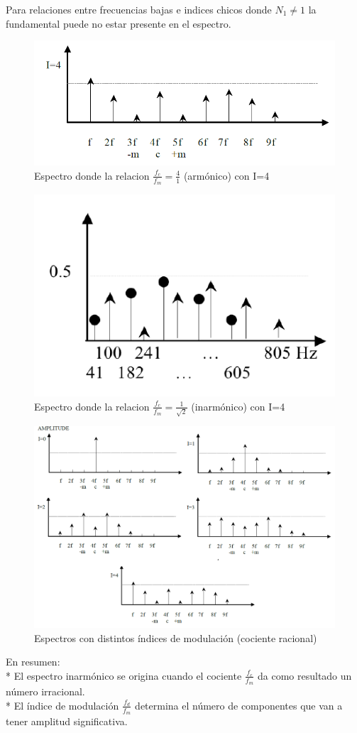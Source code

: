 \documentclass[assd_tp2_main.tex]{subfiles}
\begin{document}
Para relaciones entre frecuencias bajas e indices chicos donde $N_1\neq1$ la fundamental puede no estar presente en el espectro.

\begin{figure}[H]
\centering
\includegraphics[width=0.5\linewidth]{graficos/EJ4/espectroharmonico.png}
\caption{Espectro donde la relacion $\displaystyle \frac{f_c}{f_m}=\frac{4}{1}$ (armónico) con I=4 }
\label{fig:harmonico}
\end{figure}

\begin{figure}[H]
\centering
\includegraphics[width=0.3\linewidth]{graficos/EJ4/espectroinharmonico.png}
\caption{Espectro donde la relacion $\displaystyle \frac{f_c}{f_m}=\frac{1}{\sqrt{2}}$ (inarmónico) con I=4}
\label{fig:inharmonico}
\end{figure}

\begin{figure}[H]
\centering
\includegraphics[width=0.8\linewidth]{graficos/EJ4/chowning.png}
\caption{Espectros con distintos índices de modulación (cociente racional)}
\label{fig:chowning}
\end{figure}


En resumen:\\*
El espectro inarmónico se origina cuando el cociente $\displaystyle \frac{f_c}{f_m}$ da como resultado un número irracional. \\*
El índice de modulación $\displaystyle \frac{f_d}{f_m}$ determina el número de componentes que van a tener amplitud significativa.
\end{document}
